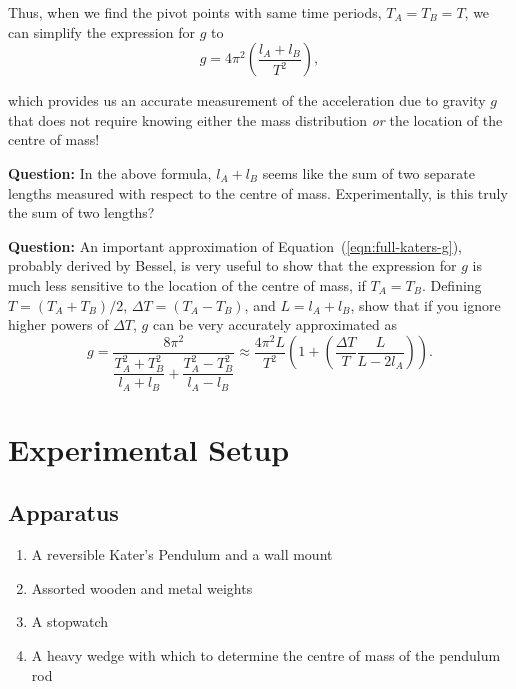 
Thus, when we find the pivot points with same time periods, $T_A = T_B = T$, we can simplify the expression for $g$ to
\begin{equation}
    g = 4\pi^2 \left(\frac{l_A + l_B}{T^2}\right),
    \label{eqn:g-TA=TB}
\end{equation}

which provides us an accurate measurement of the acceleration due to gravity $g$ that does not require knowing either the mass distribution \textsl{or} the location of the centre of mass!

\begin{question}
\textbf{Question:} In the above formula, $l_A + l_B$ seems like the sum of two separate lengths measured with respect to the centre of mass. Experimentally, is this truly the sum of two lengths? 

\textbf{Question:} An important approximation of Equation~(\ref{eqn:full-katers-g}), probably derived by Bessel, is very useful to show that the expression for $g$ is much less sensitive to the location of the centre of mass, if $T_A = T_B$. Defining $T= (T_A + T_B)/2$, $\Delta T = (T_A - T_B)$, and $L=l_A + l_B$, show that if you ignore higher powers of $\Delta T$, $g$ can be very accurately approximated as
\begin{equation}
    g = \frac{8 \pi^2}{\dfrac{T_A^2 + T_B^2}{l_A + l_B} + \dfrac{T_A^2 - T_B^2}{l_A - l_B}} \approx \frac{4 \pi^2 L}{T^2} \left( 1 + \left( \frac{\Delta T}{T} \frac{L}{L-2l_A} \right)\right).
    \label{eqn:simplified-g}
\end{equation}
\end{question}

 
\section*{Experimental Setup}

\subsection*{Apparatus}

\begin{enumerate}
\itemsep0em
    \item A reversible Kater's Pendulum and a wall mount
    \item Assorted wooden and metal weights
    \item A stopwatch 
    \item A heavy wedge with which to determine the centre of mass of the pendulum rod
\end{enumerate}



